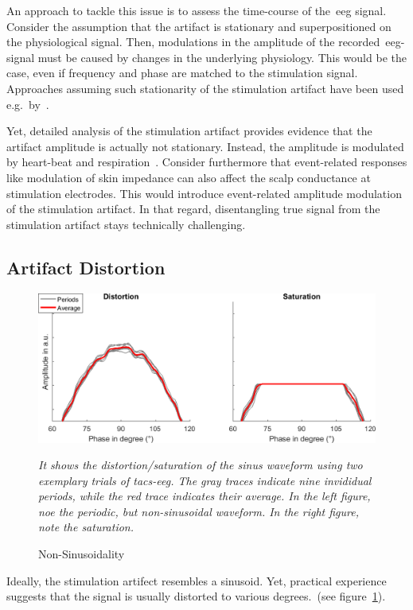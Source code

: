 \documentclass[a4paper]{article}
\newcommand{\figleg}[1]{\centering\itshape{#1}\/}
\newcommand{\figref}[1]{(see figure~\ref{#1})}
\begin{document}
An approach to tackle this issue is to assess the time-course of the~\gls{eeg} signal. Consider the assumption that the artifact is stationary and superpositioned on the physiological signal. Then, modulations in the amplitude of the recorded~\gls{eeg}-signal must be caused by changes in the underlying physiology.
This would be the case, even if frequency and phase are matched to the stimulation signal. Approaches assuming such stationarity of the stimulation artifact have been used e.g.\ by~\cite{Pogosyan_2009}.

Yet, detailed analysis of the stimulation artifact provides evidence that the artifact amplitude is actually not stationary. Instead, the amplitude is modulated by heart-beat and respiration~\citep{Noury_2016}.
Consider furthermore that event-related responses like modulation of skin impedance can also affect the scalp conductance at stimulation electrodes. This would introduce event-related amplitude modulation of the stimulation artifact. In that regard, disentangling true signal from the stimulation artifact stays technically challenging.

\subsection{Artifact Distortion}
\begin{figure}
    \includegraphics[width=\textwidth]{./img/non_sinusoidality.png}
    \caption{Non-Sinusoidality}
    \figleg{It shows the distortion/saturation of the sinus waveform using two exemplary trials of \gls{tacs}-\gls{eeg}. The gray traces indicate nine invididual periods, while the red trace indicates their average. In the left figure, noe the periodic, but non-sinusoidal waveform. In the right figure, note the saturation.}\label{fig:nonsinus}
\end{figure}

Ideally, the stimulation artifect resembles a sinusoid. Yet, practical experience suggests that the signal is usually distorted to various degrees.~\figref{fig:nonsinus}.
\end{document}
